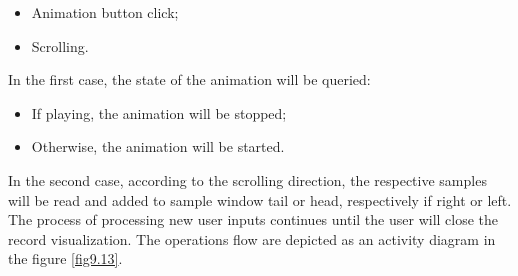 \begin{itemize}
	\item Animation button click;
	\item Scrolling.
\end{itemize}
In the first case, the state of the animation will be queried:
\begin{itemize}
	\item If playing, the animation will be stopped;
	\item Otherwise, the animation will be started.
\end{itemize}
In the second case, according to the scrolling direction, the respective samples will be read and added to sample window tail or head, respectively if right or left.\\
The process of processing new user inputs continues until the user will close the record visualization. The operations flow are depicted as an activity diagram in the figure \ref{fig9.13}.